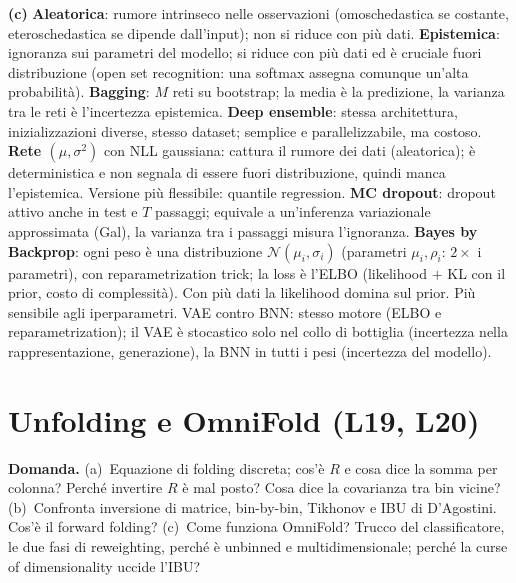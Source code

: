\documentclass[11pt,a4paper]{article}
\newcommand{\Dom}[1]{\par\medskip\noindent\textbf{Domanda.} #1\par\nopagebreak}
\begin{document}
{\textbf{(c)} \textbf{Aleatorica}: rumore intrinseco nelle osservazioni (omoschedastica se costante, eteroschedastica se dipende dall'input); non si riduce con pi\`u dati.
\textbf{Epistemica}: ignoranza sui parametri del modello; si riduce con pi\`u dati ed \`e cruciale fuori distribuzione (open set recognition: una softmax assegna comunque un'alta probabilit\`a).
\textbf{Bagging}: $M$ reti su bootstrap; la media \`e la predizione, la varianza tra le reti \`e l'incertezza epistemica.
\textbf{Deep ensemble}: stessa architettura, inizializzazioni diverse, stesso dataset; semplice e parallelizzabile, ma costoso.
\textbf{Rete $(\mu,\sigma^2)$} con NLL gaussiana: cattura il rumore dei dati (aleatorica); \`e deterministica e non segnala di essere fuori distribuzione, quindi manca l'epistemica. Versione pi\`u flessibile: quantile regression.
\textbf{MC dropout}: dropout attivo anche in test e $T$ passaggi; equivale a un'inferenza variazionale approssimata (Gal), la varianza tra i passaggi misura l'ignoranza.
\textbf{Bayes by Backprop}: ogni peso \`e una distribuzione $\mathcal N(\mu_i,\sigma_i)$ (parametri $\mu_i,\rho_i$: $2\times$ i parametri), con reparametrization trick; la loss \`e l'ELBO (likelihood $+$ KL con il prior, costo di complessit\`a). Con pi\`u dati la likelihood domina sul prior. Pi\`u sensibile agli iperparametri.
VAE contro BNN: stesso motore (ELBO e reparametrization); il VAE \`e stocastico solo nel collo di bottiglia (incertezza nella rappresentazione, generazione), la BNN in tutti i pesi (incertezza del modello).
}

\section{Unfolding e OmniFold (L19, L20)}

\Dom{(a)~Equazione di folding discreta; cos'\`e $R$ e cosa dice la somma per colonna? Perch\'e invertire $R$ \`e mal posto? Cosa dice la covarianza tra bin vicine?
(b)~Confronta inversione di matrice, bin-by-bin, Tikhonov e IBU di D'Agostini. Cos'\`e il forward folding?
(c)~Come funziona OmniFold? Trucco del classificatore, le due fasi di reweighting, perch\'e \`e unbinned e multidimensionale; perch\'e la curse of dimensionality uccide l'IBU?}
\end{document}
